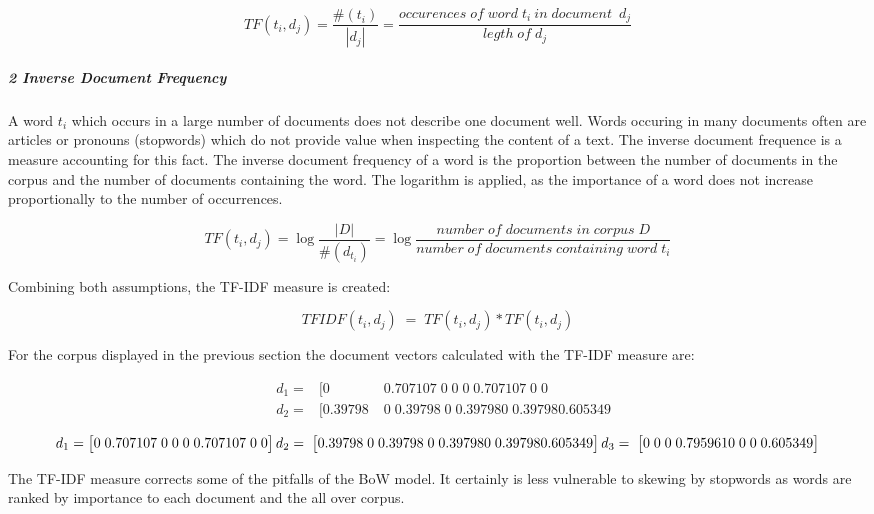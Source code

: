 		\[ TF(t_{i}, d_{j}) =   \dfrac{\#( t_{i})}{|d_{j}|} = \dfrac{occurences \; of \; word \; t_{i} \: in \; document \;\:   d_{j}}{legth \; of \; d_{j}} \]
		
		\subparagraph{2 Inverse Document Frequency}
		A word $t_{i} $ which occurs in a large number of documents does not describe one document well. Words occuring in many documents often are articles or pronouns (stopwords) which do not provide value when inspecting the content of a text. The inverse document frequence is a measure accounting for this fact. The inverse document frequency of a word is the proportion between the number of documents in the corpus and the number of documents containing the word. The logarithm is applied, as the importance of a word does not increase proportionally to the number of occurrences.
	
		
		\[ TF(t_{i}, d_{j}) = \log \dfrac{|D|}{\#(d_{t_{i}}) } =  \log \dfrac{number \;  of\;  documents \;  in \; corpus \; D}{ number \; of \; documents \; containing \; word \; t_{i}} \]
		
		Combining both assumptions, the \ac{TF-IDF} measure is created:
		
		\[ TFIDF(t_{i}, d_{j}) \;=\; TF(t_{i}, d_{j}) * TF(t_{i}, d_{j})\]
		
		For the corpus displayed in the previous section the document vectors calculated with the \ac{TF-IDF} measure are:
		
				
		\begin{align}
			&d_1 = & [ 0\;	&0.707107\;	0\;	0\;	0\;	0.707107\;	0\;	0 \\
			&d_2 = & [ 0.39798\;	&0\;	0.39798\;	0\;	0.39798	0\;	0.39798	0.605349 
		\end{align}
			
			\[d_1 = \begin{bmatrix} 0\;	0.707107\;	0\;	0\;	0\;	0.707107\;	0\;	0 \end{bmatrix}	 \\
			d_2 =  \;\begin{bmatrix} 0.39798\;	0\;	0.39798\;	0\;	0.39798	0\;	0.39798	0.605349 \end{bmatrix} \\
			d_3 = \;\begin{bmatrix} 0\;	0\;	0\;	0.795961	0\;	0\;	0\;	0.605349 \end{bmatrix} \]
			
		The \ac{TF-IDF} measure corrects some of the pitfalls of the \ac{BoW} model. It certainly is less vulnerable to skewing by stopwords as words are ranked by importance to each document and the all over corpus. 
		

